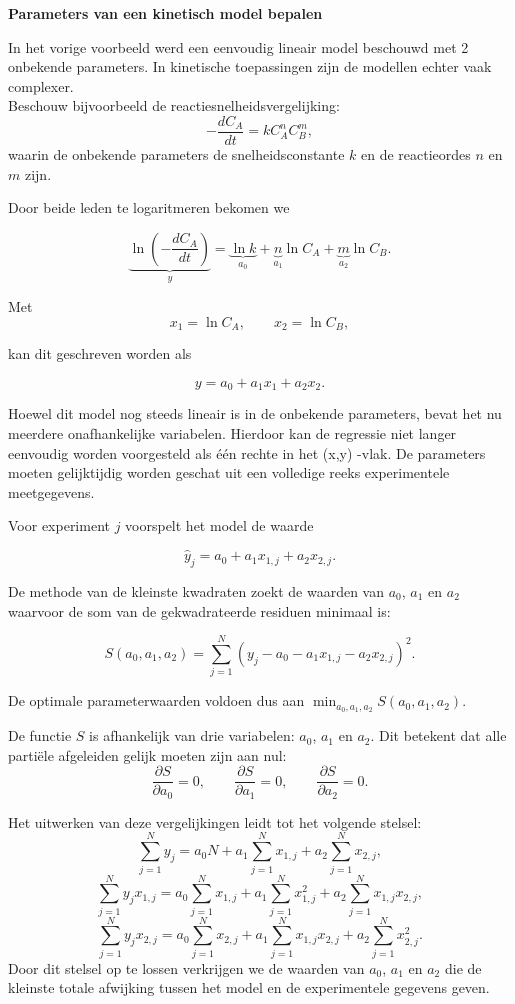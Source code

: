 \documentclass{ximera}
\begin{document}
\begin{example} \textbf{Parameters van een kinetisch model bepalen}

In het vorige voorbeeld werd een eenvoudig lineair model beschouwd met 2 onbekende parameters. In kinetische toepassingen zijn de modellen echter vaak complexer.\\
Beschouw bijvoorbeeld de reactiesnelheidsvergelijking:
\[
-\frac{dC_A}{dt}=kC_A^nC_B^m,
\]
waarin de onbekende parameters de snelheidsconstante $k$ en de reactieordes $n$ en $m$ zijn.

Door beide leden te logaritmeren bekomen we

\[
\underbrace{\ln\!\left(-\frac{dC_A}{dt}\right)}_{y}
=
\underbrace{\ln k}_{a_0}
+
\underbrace{n}_{a_1}\ln C_A
+
\underbrace{m}_{a_2}\ln C_B.
\]

Met
\[
x_1=\ln C_A,
\qquad
x_2=\ln C_B,
\]

kan dit geschreven worden als

\[
y=a_0+a_1x_1+a_2x_2.
\]

Hoewel dit model nog steeds lineair is in de onbekende parameters, bevat het nu meerdere onafhankelijke variabelen. Hierdoor kan de regressie niet langer eenvoudig worden voorgesteld als één rechte in het (x,y)
-vlak. De parameters moeten gelijktijdig worden geschat uit een volledige reeks experimentele meetgegevens.


Voor experiment $j$ voorspelt het model de waarde

\[\hat{y}_j=a_0+a_1x_{1,j}+a_2x_{2,j}.\]

De methode van de kleinste kwadraten zoekt de waarden van $a_0$, $a_1$ en
$a_2$ waarvoor de som van de gekwadrateerde residuen minimaal is:

\[ S(a_0,a_1,a_2) =\sum_{j=1}^{N}\left(y_j-a_0-a_1x_{1,j}-a_2x_{2,j}\right)^2.\]

De optimale parameterwaarden voldoen dus aan $\min_{a_0,a_1,a_2}S(a_0,a_1,a_2)$.

De functie $S$ is afhankelijk van drie variabelen: $a_0$, $a_1$ en $a_2$.
Dit betekent dat alle partiële afgeleiden gelijk moeten zijn aan nul:
\[
\frac{\partial S}{\partial a_0}=0,
\qquad
\frac{\partial S}{\partial a_1}=0,
\qquad
\frac{\partial S}{\partial a_2}=0.
\]

Het uitwerken van deze vergelijkingen leidt tot het volgende stelsel:
\[\sum_{j=1}^{N} y_j = a_0N + a_1\sum_{j=1}^{N}x_{1,j} + a_2\sum_{j=1}^{N}x_{2,j},\]
\[\sum_{j=1}^{N}y_jx_{1,j} = a_0\sum_{j=1}^{N}x_{1,j} + a_1\sum_{j=1}^{N}x_{1,j}^2 + a_2\sum_{j=1}^{N}x_{1,j}x_{2,j},\]
\[\sum_{j=1}^{N}y_jx_{2,j} = a_0\sum_{j=1}^{N}x_{2,j} + a_1\sum_{j=1}^{N}x_{1,j}x_{2,j} + a_2\sum_{j=1}^{N}x_{2,j}^2.
\]
Door dit stelsel op te lossen verkrijgen we de waarden van $a_0$, $a_1$ en $a_2$ die de
kleinste totale afwijking tussen het model en de experimentele gegevens geven.
\end{example}
\end{document}
